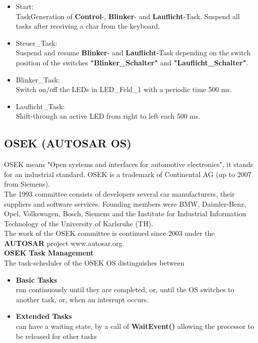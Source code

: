 \begin{itemize}
\item  Start:\\TaskGeneration of \textbf{Control}-, \textbf{Blinker}- and \textbf{Lauflicht}-Task. Suspend all tasks after receiving a char from the keyboard.

\item  Steuer\_Task:\\Suspend and resume \textbf{Blinker}- and \textbf{Lauflicht}-Task depending on the switch position of the switches \textbf{"Blinker\_Schalter"} and \textbf{"Lauflicht\_Schalter"}.

\item  Blinker\_Task:\\Switch on/off the LEDs in LED\_Feld\_1 with a periodic time 500 ms.

\item  Lauflicht\_Task:\\Shift-through an active LED from right to left each 500 ms.
\end{itemize}

\subsection{OSEK (AUTOSAR OS)}

OSEK means "Open systems and interfaces for automotive electronics", it stands for an industrial standard. OSEK is a trademark of Continental AG (up to 2007 from Siemens).\\

The 1993 committee consists of developers several car manufacturers, their suppliers and software services. Founding members were BMW, Daimler-Benz, Opel, Volkswagen, Bosch, Siemens and the Institute for Industrial Information Technology of the University of Karlsruhe (TH). \\

The work of the OSEK committee is continued since 2003 under the \textbf{AUTOSAR} project www.autosar.org\textit{.}\\

{\rot\bf OSEK Task Management}\\

The task-scheduler of the OSEK OS distinguishes between

\begin{itemize}
\item  \textbf{Basic Tasks}\\run continuously until they are completed, or, until the OS switches to another task, or, when an interrupt occurs.

\item  \textbf{Extended Tasks}\\can have a waiting state, by a call of \textbf{WaitEvent()} allowing the processor to be released for other tasks
\end{itemize}
    
